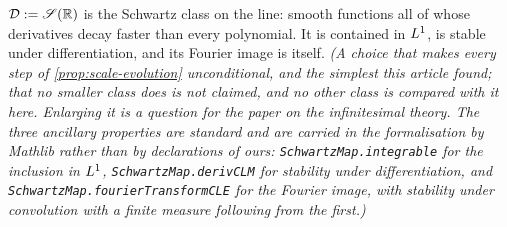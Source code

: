 \begin{definition}\label{def:signal-class}
\leanok
$\mathcal{D} := \mathscr{S}(\mathbb{R})$ is the Schwartz class on the line: smooth functions all of whose
derivatives decay faster than every polynomial. It is contained in $L^1$, is stable under
differentiation, and its Fourier image is itself.
\statusT\quad\emph{(A choice that makes every step of \ref{prop:scale-evolution}
unconditional, and the simplest this article found; that no smaller class does is not claimed,
and no other class is compared with it here. Enlarging it is a question for the paper on the
infinitesimal theory. The three
ancillary properties are standard and are carried in the formalisation by Mathlib rather than
by declarations of ours: \texttt{SchwartzMap.integrable} for the inclusion in $L^1$,
\texttt{SchwartzMap.derivCLM} for stability under differentiation, and
\texttt{SchwartzMap.fourierTransformCLE} for the Fourier image, with stability under convolution
with a finite measure following from the first.)}
\end{definition}

